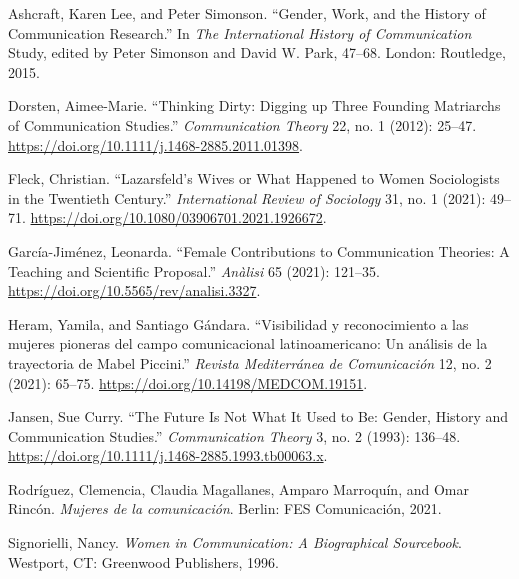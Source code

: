 \documentclass{tufte-handout}
\begin{document}
\begin{hangparas}{.25in}{1} 



Ashcraft, Karen Lee, and Peter Simonson. ``Gender, Work, and the History
of Communication Research.'' In \emph{The International History of
Communication} Study, edited by Peter Simonson and David W. Park,
47--68. London: Routledge, 2015.

Dorsten, Aimee-Marie. ``Thinking Dirty: Digging up Three Founding
Matriarchs of Communication Studies.'' \emph{Communication Theory} 22,
no. 1 (2012): 25--47.
\url{https://doi.org/10.1111/j.1468-2885.2011.01398}.

Fleck, Christian. ``Lazarsfeld's Wives or What Happened to Women
Sociologists in the Twentieth Century.'' \emph{International Review of
Sociology} 31, no. 1 (2021): 49--71.
\url{https://doi.org/10.1080/03906701.2021.1926672}.

García-Jiménez, Leonarda. ``Female Contributions to Communication
Theories: A Teaching and Scientific Proposal.'' \emph{Anàlisi} 65
(2021): 121--35. \url{https://doi.org/10.5565/rev/analisi.3327}.

Heram, Yamila, and Santiago Gándara. ``Visibilidad y reconocimiento a
las mujeres pioneras del campo comunicacional latinoamericano: Un
análisis de la trayectoria de Mabel Piccini.'' \emph{Revista
Mediterránea de Comunicación} 12, no. 2 (2021): 65--75.
\url{https://doi.org/10.14198/MEDCOM.19151}.

Jansen, Sue Curry. ``The Future Is Not What It Used to Be: Gender,
History and Communication Studies.'' \emph{Communication Theory} 3, no.
2 (1993): 136--48.
\url{https://doi.org/10.1111/j.1468-2885.1993.tb00063.x}.

Rodríguez, Clemencia, Claudia Magallanes, Amparo Marroquín, and Omar
Rincón. \emph{Mujeres de la comunicación}. Berlin: FES Comunicación,
2021.

Signorielli, Nancy. \emph{Women in Communication: A Biographical
Sourcebook}. Westport, CT: Greenwood Publishers, 1996.



\end{hangparas}
\end{document}
